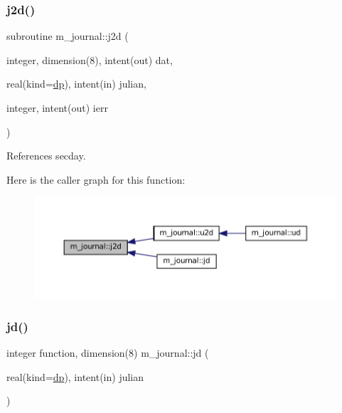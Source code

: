 \subsubsection{\texorpdfstring{j2d()}{j2d()}}
{\footnotesize\ttfamily subroutine m\+\_\+journal\+::j2d (\begin{DoxyParamCaption}\item[{integer, dimension(8), intent(out)}]{dat,  }\item[{real(kind=\mbox{\hyperlink{namespacem__journal_aaae0522a70bb76a85ea800670d5fec5f}{dp}}), intent(in)}]{julian,  }\item[{integer, intent(out)}]{ierr }\end{DoxyParamCaption})\hspace{0.3cm}{\ttfamily [private]}}



References secday.

Here is the caller graph for this function\+:\nopagebreak
\begin{figure}[H]
\begin{center}
\leavevmode
\includegraphics[width=350pt]{namespacem__journal_a3856fe36ea3b9de491627294a1488918_icgraph}
\end{center}
\end{figure}
\mbox{\label{namespacem__journal_a1e8e57f466830af519edad2004176fbc}} 
\subsubsection{\texorpdfstring{jd()}{jd()}}
{\footnotesize\ttfamily integer function, dimension(8) m\+\_\+journal\+::jd (\begin{DoxyParamCaption}\item[{real(kind=\mbox{\hyperlink{namespacem__journal_aaae0522a70bb76a85ea800670d5fec5f}{dp}}), intent(in)}]{julian }\end{DoxyParamCaption})\hspace{0.3cm}{\ttfamily [private]}}



